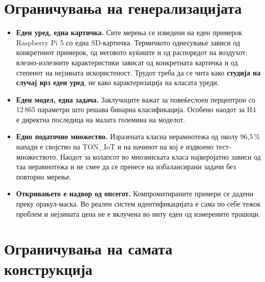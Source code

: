 \section{Ограничувања на генерализацијата}

\begin{itemize}
  \item \textbf{Еден уред, една картичка.} Сите мерења се изведени на еден примерок Raspberry Pi 5 со една SD-картичка. Термичкото однесување зависи од конкретниот примерок, од неговото куќиште и од распоредот на воздухот; влезно-излезните карактеристики зависат од конкретната картичка и од степенот на нејзината искористеност. Трудот треба да се чита како \textbf{студија на случај врз еден уред}, не како карактеризација на класата уреди.
  \item \textbf{Еден модел, една задача.} Заклучоците важат за повеќеслоен перцептрон со 12\,865 параметри што решава бинарна класификација. Особено наодот за H4 е директна последица на малата големина на моделот.
  \item \textbf{Едно податочно множество.} Изразената класна нерамнотежа од околу 96,5\,\% напади е својство на TON\_IoT и на начинот на кој е издвоено тест-множеството. Наодот за колапсот во мнозинската класа најверојатно зависи од таа нерамнотежа и не смее да се пренесе на избалансирани задачи без повторно мерење.
  \item \textbf{Откривањето е надвор од опсегот.} Компромитираните примери се дадени преку оракул-маска. Во реален систем идентификацијата е сама по себе тежок проблем и нејзината цена не е вклучена во ниту еден од измерените трошоци.
\end{itemize}

\section{Ограничувања на самата конструкција}

